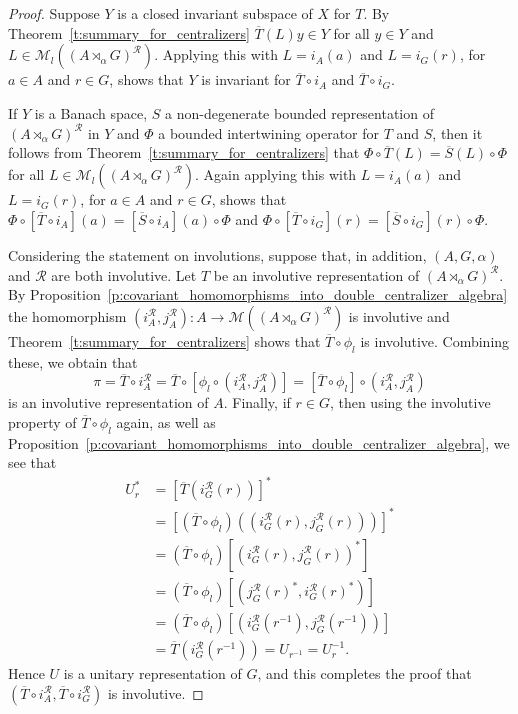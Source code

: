 \documentclass{amsart}
\theoremstyle{plain}
\theoremstyle{definition}
\numberwithin{equation}{section}
\begin{document}
\begin{proof}
Suppose $Y$ is a closed invariant subspace of $X$ for $T$. By Theorem~\ref{t:summary_for_centralizers} $\overline{T}(L)y \in Y$ for all $y \in Y$ and $L \in \mathcal{M}_l({(A {\rtimes}_\alpha G)^\mathcal{R}})$. Applying this with $L = i_A(a)$ and $L = i_G(r)$, for $a \in A$ and $r \in G$, shows that $Y$ is invariant for $\overline{T} \circ i_A$ and $\overline{T} \circ i_G$.

If $Y$ is a Banach space, $S$ a non-degenerate bounded representation of ${(A {\rtimes}_\alpha G)^\mathcal{R}}$ in $Y$ and $\Phi$ a bounded intertwining operator for $T$ and $S$, then it follows from Theorem~\ref{t:summary_for_centralizers} that $\Phi \circ \overline{T}(L) = \overline{S}(L) \circ \Phi$ for all $L \in \mathcal{M}_l({(A {\rtimes}_\alpha G)^\mathcal{R}})$. Again applying this with $L = i_A(a)$ and $L = i_G(r)$, for $a \in A$ and $r \in G$, shows that $\Phi \circ [\overline{T} \circ i_A](a) = [\overline{S} \circ i_A](a) \circ \Phi$ and $\Phi \circ [\overline{T} \circ i_G](r) = [\overline{S} \circ i_G](r) \circ \Phi$.

Considering the statement on involutions, suppose that, in addition, ${(A,G,\alpha)}$ and $\mathcal{R}$ are both involutive. Let $T$ be an involutive representation of ${(A {\rtimes}_\alpha G)^\mathcal{R}}$. By Proposition~\ref{p:covariant_homomorphisms_into_double_centralizer_algebra} the homomorphism $(i_A^{\mathcal R}, j_A^{\mathcal R}):A\to \mathcal M({(A {\rtimes}_\alpha G)^\mathcal{R}})$ is involutive and Theorem~\ref{t:summary_for_centralizers} shows that $\overline{T} \circ \phi_l$ is involutive. Combining these, we obtain that
\[
\pi=\overline{T} \circ i_A^{\mathcal R} = \overline{T} \circ \left[\phi_l \circ (i_A^{\mathcal R}, j_A^{\mathcal R})\right]=\left[\overline{T} \circ \phi_l\right] \circ (i_A^{\mathcal R}, j_A^{\mathcal R})
\]
is an involutive representation of $A$. Finally, if $r\in G$, then using the involutive property of $\overline{T} \circ \phi_l$ again, as well as Proposition~\ref{p:covariant_homomorphisms_into_double_centralizer_algebra}, we see that
\begin{align*}
U_r^*&=\left[\overline T(i_G^{\mathcal R}(r))\right]^*\\
&=\left[\left(\overline T\circ\phi_l\right)\left((i_G^{\mathcal R}(r), j_G^{\mathcal R}(r))\right)\right]^* \\
&=\left(\overline T\circ\phi_l\right)\left[ (i_G^{\mathcal R}(r), j_G^{\mathcal R}(r))^* \right] \\
&=\left(\overline T\circ\phi_l\right)\left[ (j_G^{\mathcal R}(r)^*, i_G^{\mathcal R}(r)^*)\right] \\
&=\left(\overline T\circ\phi_l\right) [(i_G^{\mathcal R}(r^{-1}), j_G^{\mathcal R}(r^{-1}))] \\
&=\overline T(i_G^{\mathcal R}(r^{-1})) = U_{r^{-1}} = U_r^{-1}.
\end{align*}
 Hence $U$ is a unitary representation of $G$, and this completes the proof that $(\overline{T} \circ i_A^{\mathcal R}, \overline{T} \circ i_G^{\mathcal R})$ is involutive.


\end{proof}
\end{document}
